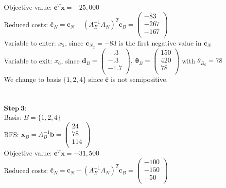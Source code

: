 \documentclass{article}
\begin{document}
Objective value: $\mathbf{c}^T \mathbf{x} = -25,000$\\
Reduced costs: $\mathbf{\bar{c}}_N = \mathbf{c}_N - (A_B^{-1} A_N)^T \mathbf{c}_B = 
\left(
    \begin{array}{c}
        -83\\
        -267\\
        -167\\
    \end{array}
\right)$\\
Variable to enter: $x_2$, since $\mathbf{\bar{c}}_{N_2} = -83$ is the first negative value in $\mathbf{\bar{c}}_N$\\
Variable to exit: $x_6$, since $\mathbf{d}_B = \left(
    \begin{array}{c}
        -.3\\
        -.3\\
        -1.7\\
    \end{array}
\right),~
\mathbf{\theta}_B = \left(
    \begin{array}{c}
        150\\
        420\\
        78\\
    \end{array}
\right)$ with $\theta_{B_6} = 78$\\
We change to basis $\{1,2,4\}$ since $\mathbf{\bar{c}}$ is not semipositive.\\
\\
\\
$\mathbf{Step~3}$:\\
Basis: $B = \{1, 2, 4\}$\\
BFS: $\mathbf{x}_B = A_B^{-1}\mathbf{b} = 
\left(
    \begin{array}{c}
        24\\
        78\\
        114\\
    \end{array}
\right)$\\
Objective value: $\mathbf{c}^T \mathbf{x} = -31,500$\\
Reduced costs: $\mathbf{\bar{c}}_N = \mathbf{c}_N - (A_B^{-1} A_N)^T \mathbf{c}_B = 
\left(
    \begin{array}{c}
        -100\\
        -150\\
        -50\\
    \end{array}
\right)$\\
\end{document}
